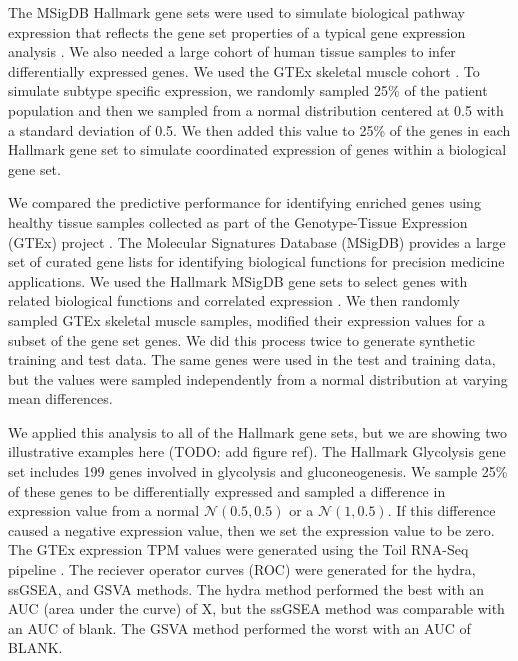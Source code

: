 \documentclass[fleqn,10pt]{wlscirep}
\begin{document}
The MSigDB Hallmark gene sets were used to simulate biological pathway expression that reflects the gene set properties of a typical gene expression analysis \cite{liberzon2015molecular,liberzon2011molecular}. We also needed a large cohort of human tissue samples to infer differentially expressed genes. We used the GTEx skeletal muscle cohort \cite{consortium2013genotype}. To simulate subtype specific expression, we randomly sampled 25\% of the patient population and then we sampled from a normal distribution centered at 0.5 with a standard deviation of 0.5. We then added this value to 25\% of the genes in each Hallmark gene set to simulate coordinated expression of genes within a biological gene set.

We compared the predictive performance for identifying enriched genes using healthy tissue samples collected as part of the Genotype-Tissue Expression (GTEx) project \cite{lonsdale2013genotype}. The Molecular Signatures Database (MSigDB) provides a large set of curated gene lists for identifying biological functions for precision medicine applications. We used the Hallmark MSigDB gene sets to select genes with related biological functions and correlated expression \cite{liberzon2015molecular}. We then randomly sampled GTEx skeletal muscle samples, modified their expression values for a subset of the gene set genes. We did this process twice to generate synthetic training and test data. The same genes were used in the test and training data, but the values were sampled independently from a normal distribution at varying mean differences. 

We applied this analysis to all of the Hallmark gene sets, but we are showing two illustrative examples here (TODO: add figure ref). The Hallmark Glycolysis gene set includes 199 genes involved in glycolysis and gluconeogenesis. We sample 25\% of these genes to be differentially expressed and sampled a difference in expression value from a normal $\mathcal{N}(0.5, 0.5)$ or a $\mathcal{N}(1, 0.5)$. If this difference caused a negative expression value, then we set the expression value to be zero. The GTEx expression TPM values were generated using the Toil RNA-Seq pipeline \cite{vivian2017toil}. The reciever operator curves (ROC) were generated for the hydra, ssGSEA, and GSVA methods. The hydra method performed the best with an AUC (area under the curve) of X, but the ssGSEA method was comparable with an AUC of blank. The GSVA method performed the worst with an AUC of BLANK.
\end{document}
